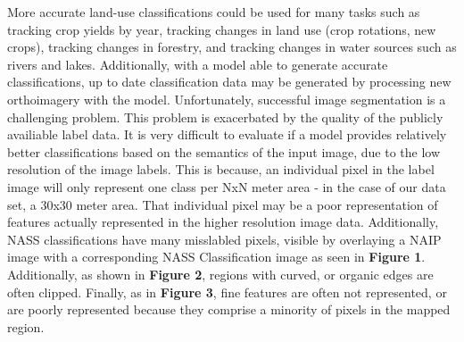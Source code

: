 \documentclass[12pt]{article}
\begin{document}
More accurate land-use classifications could be used for many tasks such as tracking crop yields by year, tracking changes in land use (crop rotations, new crops), tracking changes in forestry, and tracking changes in water sources such as rivers and lakes. Additionally, with a model able to generate accurate classifications, up to date classification data may be generated by processing new orthoimagery with the model. Unfortunately, successful image segmentation is a challenging problem. This problem is exacerbated by the quality of the publicly availiable label data. It is very difficult to evaluate if a model provides relatively better classifications based on the semantics of the input image, due to the low resolution of the image labels. This is because, an individual pixel in the label image will only represent one class per NxN meter area - in the case of our data set, a 30x30 meter area. That individual pixel may be a poor representation of features actually represented in the higher resolution image data. Additionally, NASS classifications have many misslabled pixels, visible by overlaying a NAIP image with a corresponding NASS Classification image as seen in \textbf{Figure 1}. Additionally, as shown in \textbf{Figure 2}, regions with curved, or organic edges are often clipped. Finally, as in \textbf{Figure 3}, fine features are often not represented, or are poorly represented because they comprise a minority of pixels in the mapped region.
\end{document}
